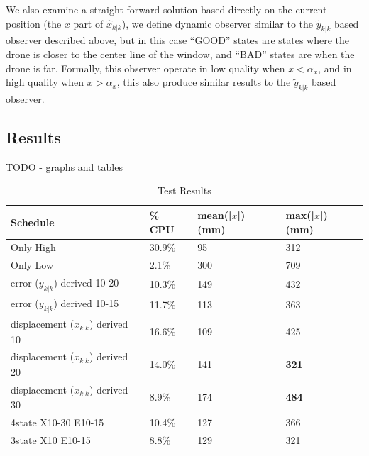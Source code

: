\documentclass{sig-alternate-ipsn13}
\begin{document}
We also examine a straight-forward solution based directly on the current position (the $x$ part of $\hat{x}_{k|k}$), we define dynamic observer similar to the $\tilde{y}_{k|k}$ based observer described above, but in this case ``GOOD'' states are states where the drone is closer to the center line of the window, and ``BAD'' states are when the drone is far.
Formally, this observer operate in low quality when $x < \alpha_x$, and in high quality when $x > \alpha_x$, this also produce similar results to the $\tilde{y}_{k|k}$ based observer.




\subsection{Results}
\label{sec:results}
TODO - graphs and tables


\begin{table}[htbp]
    \caption{Test Results}
    \begin{center}
        \begin{tabular}{m{8em} |  m{4em} m{5em} m{5em}}
            \hline
            \textbf{Schedule}& \textbf{\% CPU}  & \textbf{mean(|$x$|) (mm)} & \textbf{max(|$x$|) (mm)}\\
            \hline
            Only High & 30.9\% & 95 & 312 \\
            \hline
            Only Low & 2.1\% & 300 & 709 \\
            \hline
            error ($y_{k|k}$) derived 10-20 & 10.3\% & 149 & 432 \\
            \hline
            error ($y_{k|k}$) derived 10-15 & 11.7\% & 113 & 363 \\
            \hline
            displacement ($x_{k|k}$) derived 10 & 16.6\% & 109 & 425 \\
            \hline
            displacement ($x_{k|k}$) derived 20 & 14.0\% & 141 & \textbf{321} \\
            \hline
            displacement ($x_{k|k}$) derived 30 & 8.9\% & 174 & \textbf{484} \\
            \hline
            4state X10-30 E10-15 & 10.4\% & 127 & 366 \\
            \hline
            3state X10 E10-15 & 8.8\% & 129 & 321 \\
            \hline
            
        \end{tabular}
        \label{tab1}
    \end{center}
\end{table}
\end{document}
